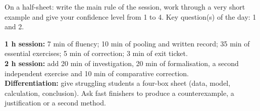 \begin{exitticket}[3 minutes]On a half-sheet: write the main rule of the session, work through a very short example and give your confidence level from 1 to 4. Key question(s) of the day: 1 and 2.\end{exitticket}

\ifmxteacher
\begin{method}
\textbf{1 h session:} 7 min of fluency; 10 min of pooling and written record; 35 min of essential exercises; 5 min of correction; 3 min of exit ticket.\\
    \textbf{2 h session:} add 20 min of investigation, 20 min of formalisation, a second independent exercise and 10 min of comparative correction.\\
    \textbf{Differentiation:} give struggling students a four-box sheet (data, model, calculation, conclusion). Ask fast finishers to produce a counterexample, a justification or a second method.
\end{method}
\fi
